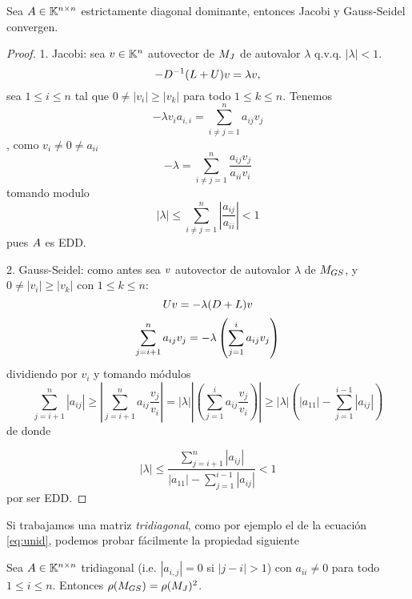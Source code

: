 \tcc
\begin{prop}
Sea $\Ab\in \Knn$ estrictamente diagonal dominante, entonces Jacobi y Gauss-Seidel convergen.
\end{prop}
\etcc
\begin{proof}
1. Jacobi: sea $\vb\in \Kn$ autovector de $\Mb_J$ de autovalor $\lambda$ q.v.q. $|\lambda|<1$.
$$
-D^{-1}(L+U)\vb=\lambda\vb,
$$
sea $1\le i\le n$ tal que
$0\neq |v_i|\ge |v_k|$ para todo $1\le k\le n$. Tenemos
$$
-\lambda v_ia_{i,i}=\sum_{i\neq j=1}^n a_{ij}v_j
$$, como $v_i\neq 0\neq a_{ii}$
$$
-\lambda=\sum_{i\neq j=1}^n \frac{a_{ij}v_j}{a_{ii}v_i}
$$
tomando modulo
$$
|\lambda|\le \sum_{i\neq j=1}^n |\frac{a_{ij}}{a_{ii}}|<1
$$
pues $\Ab$ es EDD.

2. Gauss-Seidel: como antes sea $\vb$ autovector de autovalor $\lambda$ de $\Mb_{GS}$, y $0\neq|v_i|\ge |v_k|$ con $1\le k\le n$:
$$
\Ub\vb=-\lambda(\Db+\Lb)\vb
$$
$$
\sum_{j=i+1}^na_{ij}\vb_j=-\lambda\left(
\sum_{j=1}^{i}a_{ij}\vb_j\right)
$$
dividiendo por $v_i$ y tomando módulos
$$
\sum_{j=i+1}^n|a_{ij}|
\ge \left|\sum_{j=i+1}^na_{ij}\frac{v_j}{v_i}\right|=|\lambda|\left|\left(
\sum_{j=1}^{i}a_{ij}\frac{v_j}{v_i}\right)\right|\ge |\lambda| \left(|a_{11}|-
\sum_{j=1}^{i-1}|a_{ij}|\right)
$$
de donde

$$
|\lambda|\le
\frac{\sum_{j=i+1}^n|a_{ij}|}{|a_{11}|-
\sum_{j=1}^{i-1}|a_{ij}|}
<1
$$
por ser EDD.
\end{proof}
Si trabajamos una matriz \emph{tridiagonal}, como por ejemplo el de la ecuación \eqref{eq:unid},  podemos probar fácilmente la propiedad siguiente
 \begin{prop}
\label{prop:mat_trid_gs_j}
Sea $\Ab\in \Knn$ tridiagonal (i.e. $|a_{i,j}|=0$ si $|j-i|>1$) con $a_{ii}\neq 0$ para todo $1\le i\le n$.  Entonces
$\rho(\Mb_{GS})=\rho(\Mb_{J})^2$.
\end{prop}
